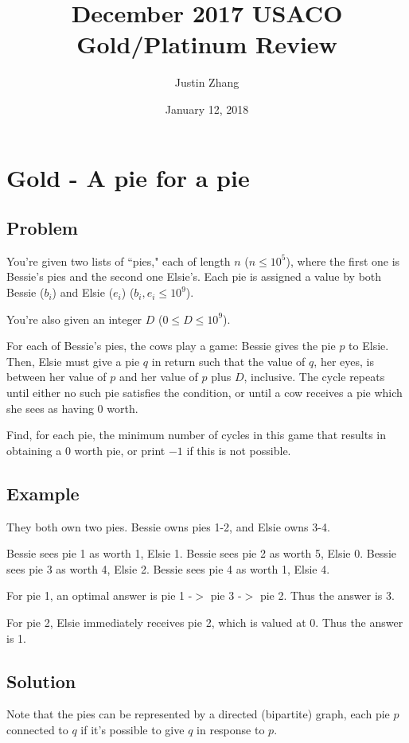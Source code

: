 \documentclass[11pt]{article}
\title{December 2017 USACO Gold/Platinum Review}
\author{Justin Zhang}
\date{January 12, 2018}
\begin{document}
\maketitle



\section{Gold - A pie for a pie}
    \subsection{Problem}
        You're given two lists of ``pies," each of length $n$ ($n \leq 10^5$), where the first one is Bessie's pies and the second one Elsie's. Each pie is assigned a value by both Bessie ($b_i$) and Elsie ($e_i$) ($b_i, e_i \leq 10^9$).
       
        You're also given an integer $D$ ($0 \leq D \leq 10^9$).
       
        For each of Bessie's pies, the cows play a game: Bessie gives the pie $p$ to Elsie. Then, Elsie must give a pie $q$ in return such that the value of $q$, her eyes, is between her value of $p$ and her value of $p$ plus $D$, inclusive. The cycle repeats until either no such pie satisfies the condition, or until a cow receives a pie which she sees as having $0$ worth.
        
        Find, for each pie, the minimum number of cycles in this game that results in obtaining a $0$ worth pie, or print $-1$ if this is not possible.
        
    \subsection{Example}
        They both own two pies. Bessie owns pies 1-2, and Elsie owns 3-4.
        
        Bessie sees pie 1 as worth 1, Elsie 1.
        Bessie sees pie 2 as worth 5, Elsie 0.
        Bessie sees pie 3 as worth 4, Elsie 2.
        Bessie sees pie 4 as worth 1, Elsie 4.
        
        For pie 1, an optimal answer is pie 1 -$>$ pie 3 -$>$ pie 2. Thus the answer is 3.
        
        For pie 2, Elsie immediately receives pie 2, which is valued at 0. Thus the answer is 1.
        
    \subsection{Solution}
        Note that the pies can be represented by a directed (bipartite) graph, each pie $p$ connected to $q$ if it's possible to give $q$ in response to $p$.
        
\end{document}

